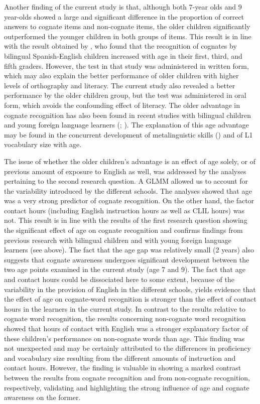 \documentclass[output=paper,modfonts,nonflat,newtxmath]{langsci/langscibook}
\begin{document}
{Another finding of the current study is that, although both 7-year olds and 9 year-olds showed a large and significant difference in the proportion of correct answers to cognate items and non-cognate items, the older children significantly outperformed the younger children in both groups of items. This result is in line with the result obtained by \citet{MalabongaEtAl2008}, who found that the recognition of cognates by bilingual Spanish-English children increased with age in their first, third, and fifth graders. However, the test in that study was administered in written form, which may also explain the better performance of older children with higher levels of orthography and literacy. The current study also revealed a better performance by the older children group, but the test was administered in oral form, which avoids the confounding effect of literacy. The older advantage in cognate recognition has also been found in recent studies with bilingual children \citep{BosmaEtAl2019} and young foreign language learners (\citealt{GoriotEtAl2018}; \citealt{MuñozEtAl2018}). The explanation of this age advantage may be found in the concurrent development of metalinguistic skills (\citealt{Muñoz2006,Muñoz2014,KelleyKohnert2012}) and of L1 vocabulary size \citep{UnsworthEtAl2015} with age.}

{The issue of whether the older children’s advantage is an effect of age solely, or of previous amount of exposure to English as well, was addressed by the analyses pertaining to the second research question. A GLMM allowed us to account for the variability introduced by the different schools. The analyses showed that age was a very strong predictor of cognate recognition. On the other hand, the factor contact hours (including English instruction hours as well as CLIL hours) was not. This result is in line with the results of the first research question showing the significant effect of age on cognate recognition and confirms findings from previous research with bilingual children and with young foreign language learners (see above). The fact that the age gap was relatively small (2 years) also suggests that cognate awareness undergoes significant development between the two age points examined in the current study (age 7 and 9). The fact that age and contact hours could be dissociated here to some extent, because of the variability in the provision of English in the different schools, yields evidence that the effect of age on cognate-word recognition is stronger than the effect of contact hours in the learners in the current study. In contrast to the results relative to cognate word recognition, the results concerning non-cognate word recognition showed that hours of contact with English was a stronger explanatory factor of these children’s performance on non-cognate words than age. This finding was not unexpected and may be certainly attributed to the differences in proficiency and vocabulary size resulting from the different amounts of instruction and contact hours. However, the finding is valuable in showing a marked contrast between the results from cognate recognition and from non-cognate recognition, respectively, validating and highlighting the strong influence of age and cognate awareness on the former.}
\end{document}
